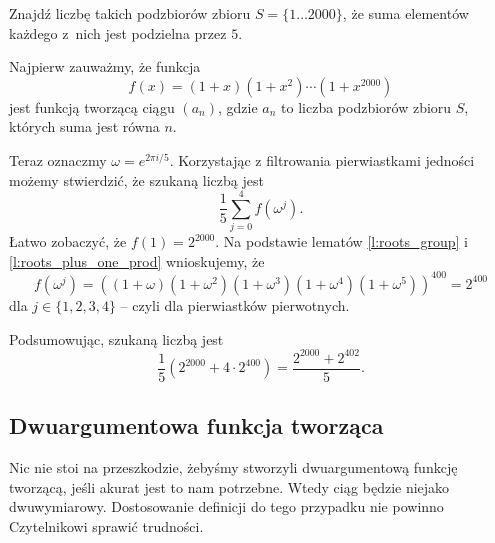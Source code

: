 \documentclass{scrartcl}
\begin{document}
    \begin{example}
        Znajdź liczbę takich podzbiorów zbioru $S = \{1\ldots 2000\}$, że suma elementów każdego z~nich jest podzielna przez $5$.
    \end{example}
    \begin{solution}
        Najpierw zauważmy, że funkcja
        $$ f(x) = (1 + x)(1 + x^2)\cdots(1 + x^{2000}) $$
        jest funkcją tworzącą ciągu $(a_n)$, gdzie $a_n$ to liczba podzbiorów zbioru $S$, których suma jest równa $n$.

        Teraz oznaczmy $\omega = e^{2\pi i / 5}$. Korzystając z filtrowania pierwiastkami jedności możemy stwierdzić, że szukaną liczbą jest
        $$ \frac{1}{5}\sum_{j=0}^4 f(\omega^j). $$
        Łatwo zobaczyć, że $f(1) = 2^{2000}$. Na podstawie lematów \ref{l:roots_group} i \ref{l:roots_plus_one_prod} wnioskujemy, że
        $$ f(\omega^j) = \left((1 + \omega)(1 + \omega^2)(1 + \omega^3)(1 + \omega^4)(1 + \omega^5)\right)^{400} = 2^{400} $$
        dla $j \in \{1, 2, 3, 4\}$ -- czyli dla pierwiastków pierwotnych.

        Podsumowując, szukaną liczbą jest
        $$ \frac{1}{5}\left(2^{2000} + 4\cdot 2^{400}\right) = \frac{2^{2000} + 2^{402}}{5}. $$
    \end{solution}

    \subsection{Dwuargumentowa funkcja tworząca}
    Nic nie stoi na przeszkodzie, żebyśmy stworzyli dwuargumentową funkcję tworzącą, jeśli akurat jest to nam potrzebne. Wtedy ciąg będzie niejako dwuwymiarowy. Dostosowanie definicji do tego przypadku nie powinno Czytelnikowi sprawić trudności.
\end{document}
